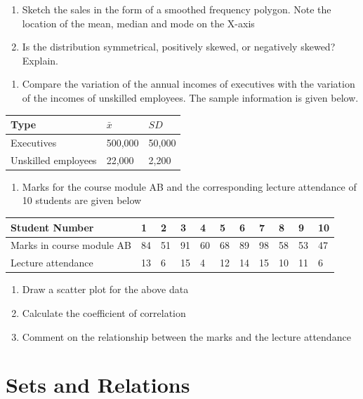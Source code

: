 \documentclass[]{book}
\providecommand{\tightlist}{%
  \setlength{\itemsep}{0pt}\setlength{\parskip}{0pt}}
\begin{document}
\begin{enumerate}
\def\labelenumi{(\alph{enumi})}
\tightlist
\item
  Sketch the sales in the form of a smoothed frequency polygon. Note the location of the mean, median and mode on the X-axis
\item
  Is the distribution symmetrical, positively skewed, or negatively skewed? Explain.
\end{enumerate}

\begin{enumerate}
\def\labelenumi{\arabic{enumi}.}
\setcounter{enumi}{14}
\tightlist
\item
  Compare the variation of the annual incomes of executives with the variation of the incomes of unskilled employees. The sample information is given below.
\end{enumerate}

\begin{longtable}[]{@{}lll@{}}
\toprule
Type & \(\bar{x}\) & \(SD\)\tabularnewline
\midrule
\endhead
Executives & 500,000 & 50,000\tabularnewline
Unskilled employees & 22,000 & 2,200\tabularnewline
\bottomrule
\end{longtable}

\begin{enumerate}
\def\labelenumi{\arabic{enumi}.}
\setcounter{enumi}{15}
\tightlist
\item
  Marks for the course module AB and the corresponding lecture attendance of 10 students are given below
\end{enumerate}

\begin{longtable}[]{@{}lllllllllll@{}}
\toprule
Student Number & 1 & 2 & 3 & 4 & 5 & 6 & 7 & 8 & 9 & 10\tabularnewline
\midrule
\endhead
Marks in course module AB & 84 & 51 & 91 & 60 & 68 & 89 & 98 & 58 & 53 & 47\tabularnewline
Lecture attendance & 13 & 6 & 15 & 4 & 12 & 14 & 15 & 10 & 11 & 6\tabularnewline
\bottomrule
\end{longtable}

\begin{enumerate}
\def\labelenumi{(\alph{enumi})}
\tightlist
\item
  Draw a scatter plot for the above data
\item
  Calculate the coefficient of correlation
\item
  Comment on the relationship between the marks and the lecture attendance
\end{enumerate}

\hypertarget{sets-and-relations}{%
\chapter{Sets and Relations}\label{sets-and-relations}}
\end{document}
